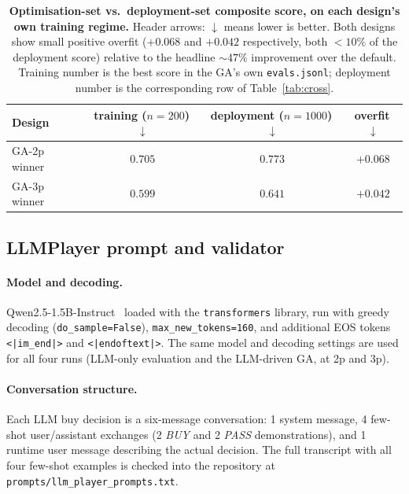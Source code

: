 \documentclass[10pt]{article}
\begin{document}
\begin{table}[h!]
\centering
\small
\begin{tabular}{lccc}
\toprule
Design & training ($n{=}200$)\,$\downarrow$ & deployment ($n{=}1000$)\,$\downarrow$ & overfit\,$\downarrow$ \\
\midrule
GA-2p winner & $0.705$ & $0.773$ & $+0.068$ \\
GA-3p winner & $0.599$ & $0.641$ & $+0.042$ \\
\bottomrule
\end{tabular}
\caption{\textbf{Optimisation-set vs.\ deployment-set composite
score, on each design's own training regime.} Header arrows:
$\downarrow$ means lower is better. Both designs show small
positive overfit ($+0.068$ and $+0.042$ respectively, both
$<\!10\%$ of the deployment score) relative to the headline
$\sim$$47\%$ improvement over the default. Training number is the
best score in the GA's own \texttt{evals.jsonl}; deployment number
is the corresponding row of Table~\ref{tab:cross}.}
\label{tab:overfit}
\end{table}

\subsection{LLMPlayer prompt and validator}\label{app:llm}

\paragraph{Model and decoding.} Qwen2.5-1.5B-Instruct~\cite{qwen25}
loaded with the \texttt{transformers} library, run with greedy
decoding (\texttt{do\_sample=False}), \texttt{max\_new\_tokens=160},
and additional EOS tokens \texttt{<|im\_end|>} and
\texttt{<|endoftext|>}. The same model and decoding settings are
used for all four runs (LLM-only evaluation and the LLM-driven GA, at 2p
and 3p).

\paragraph{Conversation structure.} Each LLM buy decision is a
six-message conversation: 1 system message, 4 few-shot
user/assistant exchanges (2 \emph{BUY} and 2 \emph{PASS}
demonstrations), and 1 runtime user message describing the actual
decision. The full transcript with all four few-shot examples is
checked into the repository at
\texttt{prompts/llm\_player\_prompts.txt}.
\end{document}
